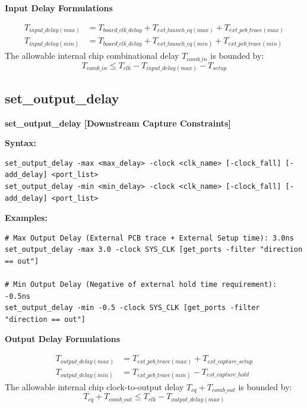 \documentclass[11pt,a4paper]{article}
\newenvironment{cmdbox}[2]{%
  \begin{mdframed}[style=cmdstyle]%
  {\bfseries\sffamily\color{primary}#1 \hfill \footnotesize\color{mutedgray}[#2]}\par\vspace{3pt}%
}{%
  \end{mdframed}%
}
\newenvironment{formulabox}[1]{%
  \begin{mdframed}[style=formstyle]%
  {\bfseries\sffamily\color{primary}\small #1}\par\vspace{2pt}\small%
}{%
  \end{mdframed}%
}
\begin{document}
\begin{formulabox}{Input Delay Formulations}
\begin{align}
  T_{input\_delay(max)} &= T_{board\_clk\_delay} + T_{ext\_launch\_cq(max)} + T_{ext\_pcb\_trace(max)} \\
  T_{input\_delay(min)} &= T_{board\_clk\_delay} + T_{ext\_launch\_cq(min)} + T_{ext\_pcb\_trace(min)}
\end{align}
The allowable internal chip combinational delay $T_{comb\_in}$ is bounded by:
\begin{equation}
  T_{comb\_in} \le T_{clk} - T_{input\_delay(max)} - T_{setup}
\end{equation}
\end{formulabox}

\subsection{set\_output\_delay}
\begin{cmdbox}{set\_output\_delay}{Downstream Capture Constraints}
\textbf{Syntax:}
\begin{lstlisting}[style=sdcstyle]
set_output_delay -max <max_delay> -clock <clk_name> [-clock_fall] [-add_delay] <port_list>
set_output_delay -min <min_delay> -clock <clk_name> [-clock_fall] [-add_delay] <port_list>
\end{lstlisting}
\textbf{Examples:}
\begin{lstlisting}[style=sdcstyle]
# Max Output Delay (External PCB trace + External Setup time): 3.0ns
set_output_delay -max 3.0 -clock SYS_CLK [get_ports -filter "direction == out"]

# Min Output Delay (Negative of external hold time requirement): -0.5ns
set_output_delay -min -0.5 -clock SYS_CLK [get_ports -filter "direction == out"]
\end{lstlisting}
\end{cmdbox}

\begin{formulabox}{Output Delay Formulations}
\begin{align}
  T_{output\_delay(max)} &= T_{ext\_pcb\_trace(max)} + T_{ext\_capture\_setup} \\
  T_{output\_delay(min)} &= T_{ext\_pcb\_trace(min)} - T_{ext\_capture\_hold}
\end{align}
The allowable internal chip clock-to-output delay $T_{cq} + T_{comb\_out}$ is bounded by:
\begin{equation}
  T_{cq} + T_{comb\_out} \le T_{clk} - T_{output\_delay(max)}
\end{equation}
\end{formulabox}
\end{document}
